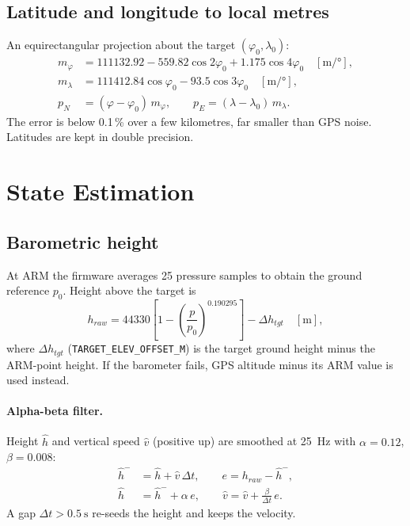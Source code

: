 \documentclass[11pt,a4paper]{article}
\newcommand{\code}[1]{\texttt{#1}}
\begin{document}
\subsection{Latitude and longitude to local metres}
An equirectangular projection about the target $(\varphi_0, \lambda_0)$:
\begin{align}
  m_\varphi &= 111132.92 - 559.82\cos 2\varphi_0 + 1.175\cos 4\varphi_0 \quad [\si{\meter\per\degree}],\\
  m_\lambda &= 111412.84\cos\varphi_0 - 93.5\cos 3\varphi_0 \quad [\si{\meter\per\degree}],\\
  p_N &= (\varphi - \varphi_0)\, m_\varphi, \qquad p_E = (\lambda - \lambda_0)\, m_\lambda .
\end{align}
The error is below 0.1\,\% over a few kilometres, far smaller than GPS noise.
Latitudes are kept in double precision.

\section{State Estimation}

\subsection{Barometric height}
At ARM the firmware averages 25 pressure samples to obtain the ground
reference $p_0$. Height above the target is
\begin{equation}
  h_{raw} = 44330\left[1 - \left(\frac{p}{p_0}\right)^{0.190295}\right] - \Delta h_{tgt} \quad [\si{\meter}],
\end{equation}
where $\Delta h_{tgt}$ (\code{TARGET\_ELEV\_OFFSET\_M}) is the target ground
height minus the ARM-point height. If the barometer fails, GPS altitude minus
its ARM value is used instead.

\paragraph{Alpha-beta filter.} Height $\hat h$ and vertical speed $\hat v$
(positive up) are smoothed at \SI{25}{\hertz} with $\alpha = 0.12$,
$\beta = 0.008$:
\begin{align}
  \hat h^- &= \hat h + \hat v\,\Delta t, \qquad e = h_{raw} - \hat h^-,\\
  \hat h &= \hat h^- + \alpha\, e, \qquad \hat v = \hat v + \frac{\beta}{\Delta t}\, e .
\end{align}
A gap $\Delta t > \SI{0.5}{\second}$ re-seeds the height and keeps the velocity.
\end{document}
